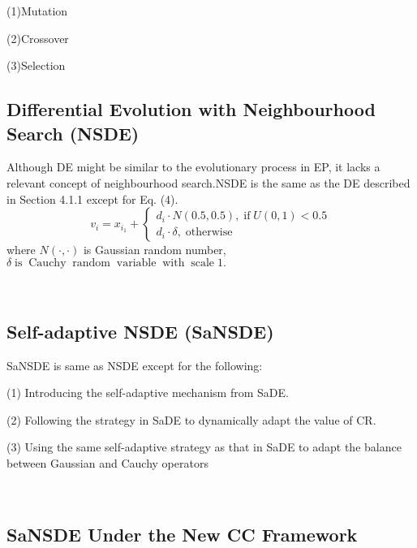 \documentclass{article}
\newcommand{\comma}{{,}}
\newcommand{\tmop}[1]{\ensuremath{\operatorname{#1}}}
\begin{document}
(1)Mutation

(2)Crossover

(3)Selection

\subsection{Differential Evolution with Neighbourhood Search (NSDE)}

Although DE might be similar to the evolutionary process in EP, it lacks a
relevant concept of neighbourhood search.NSDE is the same as the DE described
in Section 4.1.1 except for Eq. (4).
\begin{equation}
  v_i = x_{i_1} + \left\{ \begin{array}{l}
    d_i \cdot N (0.5, 0.5), \tmop{if} U (0, 1) < 0.5\\
    d_i \cdot \delta, \tmop{otherwise}
  \end{array} \right.
\end{equation}
where $N (\cdot \comma \cdot)$ is Gaussian random number, $\delta \tmop{is}
\tmop{Cauchy} \tmop{random} \tmop{variable} \tmop{with} \tmop{scale} 1.$

\

\subsection{Self-adaptive NSDE (SaNSDE)}

SaNSDE is same as NSDE except for the following:

(1) Introducing the self-adaptive mechanism from SaDE.

(2) Following the strategy in SaDE to dynamically adapt the value of CR.

(3) Using the same self-adaptive strategy as that in SaDE to adapt the balance
between Gaussian and Cauchy operators

\

\subsection{SaNSDE Under the New CC Framework}

\

\
\end{document}
